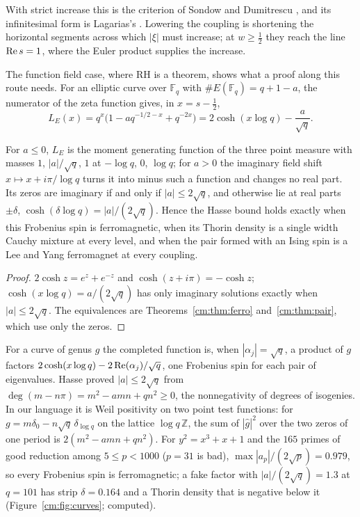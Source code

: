 With strict increase this is the criterion of Sondow and Dumitrescu \cite{SD10}, and its infinitesimal form is Lagarias's \cite{Lagarias}. Lowering the coupling is shortening the horizontal segments across which $|\xi|$ must increase; at $w\ge\frac12$ they reach the line $\operatorname{Re} s=1$, where the Euler product supplies the increase.

The function field case, where RH is a theorem, shows what a proof along this route needs. For an elliptic curve over $\mathbb F_q$ with $\#E(\mathbb F_q)=q+1-a$, the numerator of the zeta function gives, in $x=s-\frac12$,
\[
L_E(x)=q^x\big(1-aq^{-1/2-x}+q^{-2x}\big)=2\cosh(x\log q)-\frac a{\sqrt q}.
\]

\begin{proposition}\label{cm:prop:frob}
For $a\le0$, $L_E$ is the moment generating function of the three point measure with masses $1$, $|a|/\sqrt q$, $1$ at $-\log q$, $0$, $\log q$; for $a>0$ the imaginary field shift $x\mapsto x+i\pi/\log q$ turns it into minus such a function and changes no real part. Its zeros are imaginary if and only if $|a|\le2\sqrt q$, and otherwise lie at real parts $\pm\delta$, $\cosh(\delta\log q)=|a|/(2\sqrt q)$. Hence the Hasse bound holds exactly when this Frobenius spin is ferromagnetic, when its Thorin density is a single width Cauchy mixture at every level, and when the pair formed with an Ising spin is a Lee and Yang ferromagnet at every coupling.
\end{proposition}

\begin{proof}
$2\cosh z=e^z+e^{-z}$ and $\cosh(z+i\pi)=-\cosh z$; $\cosh(x\log q)=a/(2\sqrt q)$ has only imaginary solutions exactly when $|a|\le2\sqrt q$. The equivalences are Theorems~\ref{cm:thm:ferro} and~\ref{cm:thm:pair}, which use only the zeros.
\end{proof}

For a curve of genus $g$ the completed function is, when $|\alpha_j|=\sqrt q$, a product of $g$ factors $2\cosh(x\log q)-2\operatorname{Re}(\alpha_j)/\sqrt q$, one Frobenius spin for each pair of eigenvalues. Hasse proved $|a|\le2\sqrt q$ from $\deg(m-n\pi)=m^2-amn+qn^2\ge0$, the nonnegativity of degrees of isogenies. In our language it is Weil positivity on two point test functions: for $g=m\delta_0-n\sqrt q\,\delta_{\log q}$ on the lattice $\log q\,\mathbb Z$, the sum of $|\widehat g|^2$ over the two zeros of one period is $2(m^2-amn+qn^2)$. For $y^2=x^3+x+1$ and the $165$ primes of good reduction among $5\le p<1000$ ($p=31$ is bad), $\max|a_p|/(2\sqrt p)=0.979$, so every Frobenius spin is ferromagnetic; a fake factor with $|a|/(2\sqrt q)=1.3$ at $q=101$ has strip $\delta=0.164$ and a Thorin density that is negative below it (Figure~\ref{cm:fig:curves}; computed).

